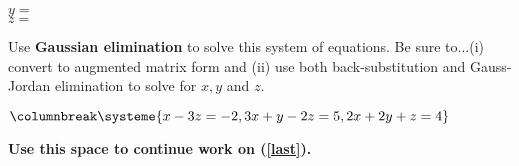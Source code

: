 \documentclass{exam}
\begin{document}
\begin{questions}
\begin{multicols}{2}
\hspace{2cm}$y = $ \fillin \\

\hspace{2cm}$z = $ \fillin \\
\end{multicols}
\makeemptybox{3in}


\question
\label{last}
\begin{multicols}{2}
Use \textbf{Gaussian elimination} to solve this system of equations.  Be sure to...(i) convert to augmented matrix form and (ii) use both back-substitution and Gauss-Jordan elimination to solve for $x, y$ and $z$.


$
\columnbreak
\systeme{
x - 3z = -2,
3x + y    - 2z = 5,
2x + 2y + z = 4
}
$


\end{multicols}


\end{questions}

\newpage
\textbf{Use this space to continue work on (\ref{last}).}

\thispagestyle{empty}
\end{document}
